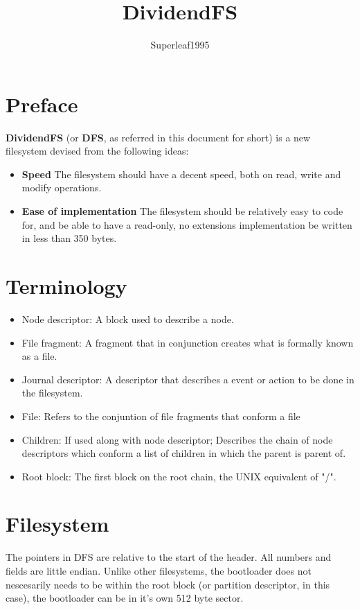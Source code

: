 \documentclass[12pt]{article}
\title{DividendFS}
\author{Superleaf1995}
\begin{document}
\maketitle

\newpage

\section{Preface}
\textbf{DividendFS} (or \textbf{DFS}, as referred in this document for short) is a new filesystem devised from the following ideas:

\begin{itemize}
	\item \textbf{Speed} The filesystem should have a decent speed, both on read, write and modify operations.
	\item \textbf{Ease of implementation} The filesystem should be relatively easy to code for, and be able to have a read-only, no extensions implementation be written in less than 350 bytes.
\end{itemize}

\newpage

\section{Terminology}
\begin{itemize}
	\item Node descriptor: A block used to describe a node.
	\item File fragment: A fragment that in conjunction creates what is formally known as a file.
	\item Journal descriptor: A descriptor that describes a event or action to be done in the filesystem.
	\item File: Refers to the conjuntion of file fragments that conform a file
	\item Children: If used along with node descriptor; Describes the chain of node descriptors which conform a list of children in which the parent is parent of.
	\item Root block: The first block on the root chain, the UNIX equivalent of "/".
\end{itemize}

\newpage

\section{Filesystem}
The pointers in DFS are relative to the start of the header. All numbers and fields are little endian.
Unlike other filesystems, the bootloader does not nescesarily needs to be within the root block (or partition descriptor, in this case), the bootloader can be in it's own 512 byte sector.
\end{document}
